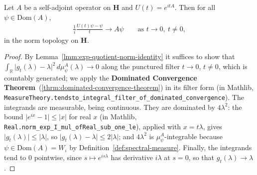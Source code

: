 \begin{lemma}
    \label{lmm:exp-derivative-at-zero}
    \leanok
    Let $A$ be a self-adjoint operator on $\mathbf{H}$ and $U(t) = e^{itA}$. Then for all $\psi \in \text{Dom}(A)$,
    \begin{align}
        \frac{1}{i} \frac{U(t)\psi - \psi}{t} \longrightarrow A\psi \qquad \text{as } t \rightarrow 0,\ t \ne 0,
    \end{align}
    in the norm topology on $\mathbf{H}$.
\end{lemma}
\begin{proof}
    \leanok
By Lemma~\ref{lmm:exp-quotient-norm-identity} it suffices to show that $\int_{\mathbb{R}} \lvert g_t(\lambda) - \lambda \rvert^2 \, d\mu^A_\psi(\lambda) \to 0$ along the punctured filter $t \to 0$, $t \ne 0$, which is countably generated; we apply the \textbf{Dominated Convergence Theorem}~(\ref{thrm:dominated-convergence-theorem}) in its filter form (in Mathlib, \texttt{MeasureTheory.tendsto\_integral\_filter\_of\_dominated\_convergence}). The integrands are measurable, being continuous. They are dominated by $4\lambda^2$: the bound $\lvert e^{ix} - 1 \rvert \le \lvert x \rvert$ for real $x$ (in Mathlib, \texttt{Real.norm\_exp\_I\_mul\_ofReal\_sub\_one\_le}), applied with $x = t\lambda$, gives $\lvert g_t(\lambda) \rvert \le \lvert \lambda \rvert$, so $\lvert g_t(\lambda) - \lambda \rvert \le 2\lvert \lambda \rvert$; and $4\lambda^2$ is $\mu^A_\psi$-integrable because $\psi \in \text{Dom}(A) = W_\iota$ by Definition~\ref{def:spectral-measure}. Finally, the integrands tend to $0$ pointwise, since $s \mapsto e^{is\lambda}$ has derivative $i\lambda$ at $s = 0$, so that $g_t(\lambda) \to \lambda$.
\end{proof}

